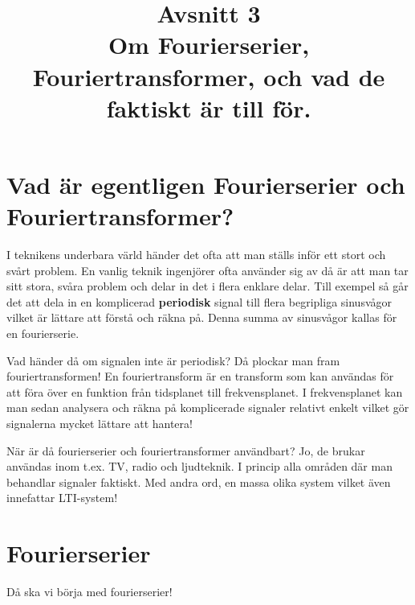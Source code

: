 \documentclass{article}
\title{Avsnitt 3 \\
\large Om Fourierserier, Fouriertransformer, och vad de faktiskt är till för.}
\author{ }
\date{}
\begin{document}
\maketitle

\section{Vad är egentligen Fourierserier och Fouriertransformer?}
I teknikens underbara värld händer det ofta att man ställs inför ett stort och
svårt problem. En vanlig teknik ingenjörer ofta använder sig av då är att man
tar sitt stora, svåra problem och delar in det i flera enklare delar.
Till exempel så går det att dela in en komplicerad \textbf{periodisk} signal
till flera begripliga sinusvågor vilket är lättare att förstå och räkna på.
Denna summa av sinusvågor kallas för en fourierserie.

Vad händer då om signalen inte är periodisk? Då plockar man fram fouriertransformen!
En fouriertransform är en transform som kan användas för att föra över en funktion
från tidsplanet till frekvensplanet. I frekvensplanet kan man sedan analysera och
räkna på komplicerade signaler relativt enkelt vilket gör signalerna mycket lättare
att hantera!

När är då fourierserier och fouriertransformer användbart?
Jo, de brukar användas inom t.ex. TV, radio och ljudteknik.
I princip alla områden där man behandlar signaler faktiskt.
Med andra ord, en massa olika system vilket även innefattar LTI-system!

\section{Fourierserier}

Då ska vi börja med fourierserier!
\end{document}
